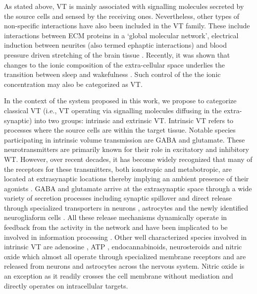     As stated above, VT is mainly associated with signalling molecules secreted by the source cells and sensed by the receiving ones. Nevertheless, other types of non-specific interactions have also been included in the VT family. These include interactions between ECM proteins in a `global molecular network', electrical induction between neurites (also termed ephaptic interactions) and blood pressure driven stretching of the brain tissue \cite{agnati2006volume}. Recently, it was shown that changes to the ionic composition of the extra-cellular space underlies the transition between sleep and wakefulness \cite{ding2016changes}. Such control of the the ionic concentration may also be categorized as VT.

    In the context of the system proposed in this work, we propose to categorize classical VT (i.e., VT operating via signalling molecules diffusing in the extra-synaptic) into two groups: intrinsic and extrinsic VT. Intrinsic VT refers to processes where the source cells are within the target tissue. Notable species participating in intrinsic volume transmission are GABA and glutamate. These neurotransmitters are primarily known for their role in excitatory and inhibitory WT. However, over recent decades, it has become widely recognized that many of the receptors for these transmitters, both ionotropic and metabotropic, are located at extrasynaptic locations thereby implying an ambient presence of their agonists \cite{farrant2005variations,taber2014volume}. GABA and glutamate arrive at the extrasynaptic space through a wide variety of secretion processes including synaptic spillover \cite{matsui2003ectopic,hamann2002tonic,bellamy2006interactions} and direct release through specialized transporters in neurons \cite{cavelier2005tonic}, astrocytes \cite{lee2010channel,cavelier2005DIDS} and the newly identified neurogliaform cells \cite{olah2009regulation}. All these release mechanisms dynamically operate in feedback from the activity in the network and have been implicated to be involved in information processing \cite{mann2010control,hamann2002tonic,lenk2016understanding,cavelier2005tonic}. Other well characterized species involved in intrinsic VT are adenosine \cite{wall2015localized}, ATP \cite{zhang2003atp}, endocannabinoids, neurosteroids and nitric oxide \cite{fuxe2010discovery,bellamy2000rapid} which almost all operate through specialized membrane receptors and are released from neurons and astrocytes across the nervous system. Nitric oxide is an exception as it readily crosses the cell membrane without mediation and directly operates on intracellular targets.

